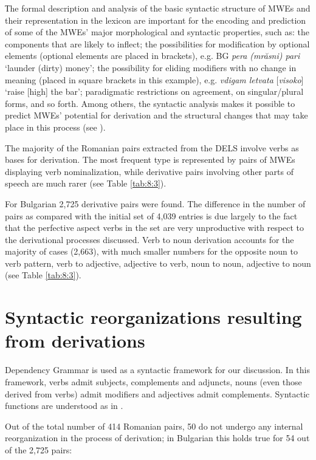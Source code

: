 \documentclass[output=paper]{langsci/langscibook}
\begin{document}
Тhe formal description and analysis of the basic syntactic structure of
MWEs and their representation in the lexicon are important for the
encoding and prediction of some of the MWEs’ major morphological and
syntactic properties, such as: the components that are likely to
inflect; the possibilities for modification by optional elements
(optional elements are placed in brackets), e.g. BG \textit{pera (mrăsni)
pari} ‘launder (dirty) money’; the possibility for eliding modifiers
with no change in meaning (placed in square brackets in this example),
e.g. \textit{vdigam letvata} [\textit{visoko}] ‘raise [high] the bar’; paradigmatic
restrictions on agreement, on singular/plural forms, and so forth.
Among others, the syntactic analysis makes it possible to predict MWEs’
potential for derivation and the structural changes that may take place
in this process (see ).



The majority of the Romanian pairs extracted from the DELS involve verbs
as bases for derivation. The most frequent type is represented by pairs
of MWEs displaying verb nominalization, while derivative pairs
involving other parts of speech are much rarer (see Table \ref{tab:8:3}). 



For Bulgarian 2,725 derivative pairs were found. The difference in the
number of pairs as compared with the initial set of 4,039 entries is
due largely to the fact that the perfective aspect verbs in the set are
very unproductive with respect to the derivational processes discussed.
Verb to noun derivation accounts for the majority of cases (2,663),
with much smaller numbers for the opposite noun to verb pattern, verb
to adjective, adjective to verb, noun to noun, adjective to noun (see
Table \ref{tab:8:3}). 

\section{Syntactic reorganizations resulting from derivations}
\label{section6}

Dependency Grammar is used as a syntactic framework for our discussion.
In this framework, verbs admit subjects, complements and adjuncts,
nouns (even those derived from verbs) admit modifiers and adjectives
admit complements. Syntactic functions are understood as in \cite{quirk1985}.



Out of the total number of 414 Romanian pairs, 50 do not undergo any
internal reorganization in the process of derivation; in Bulgarian this
holds true for 54 out of the 2,725 pairs: 
\end{document}
